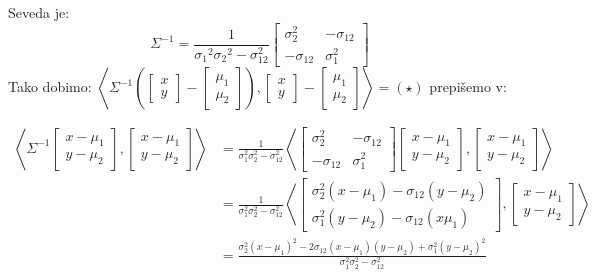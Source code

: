 \documentclass[12pt]{book}
\def\n{\noindent}
\theoremstyle{definition}
\theoremstyle{plain}
\theoremstyle{plain}
\theoremstyle{plain}
\theoremstyle{plain}
\theoremstyle{remark}
\begin{document}
\n Seveda je: 
$$
\Sigma^{-1}=\frac{1}{\sigma_1{ }^2 \sigma_2{ }^2-\sigma_{12}^2}\begin{bmatrix} \sigma_2^2 & -\sigma_{12} \\ -\sigma_{1 2} & \sigma_1^2 \end{bmatrix}
$$
Tako dobimo:  $\left\langle\Sigma^{-1}\left(\begin{bmatrix} x \\ y \end{bmatrix}-\begin{bmatrix} \mu_1 \\ \mu_2 \end{bmatrix}\right),\begin{bmatrix} x \\ y \end{bmatrix}-\begin{bmatrix} \mu_1 \\ \mu_2 \end{bmatrix}\right\rangle = (\star)$ prepišemo v: 

\begin{align*}
    \left\langle\Sigma^{-1}\begin{bmatrix} x - \mu_1 \\ y - \mu_2 \end{bmatrix},\begin{bmatrix} x - \mu_1 \\ y - \mu_2 \end{bmatrix}\right\rangle &= \frac{1}{\sigma_1^2 \sigma_2^2-\sigma_{12}^2} \left\langle \begin{bmatrix}\sigma_2^2 & -\sigma_{12} \\ -\sigma_{12} & \sigma_1^2 \end{bmatrix}\begin{bmatrix} x-\mu_1 \\ y-\mu_2 \end{bmatrix}, \begin{bmatrix} x-\mu_1 \\ y-\mu_2 \end{bmatrix}\right\rangle \\
    &= \frac{1}{\sigma_1^2 \sigma_2^2-\sigma_{12}^2} \left\langle \begin{bmatrix} \sigma_2^2\left(x-\mu_1\right)-\sigma_{12}\left(y-\mu_2\right) \\ \sigma_1^2\left(y-\mu_2\right)-\sigma_{12}\left(x \mu_1\right) \end{bmatrix}, \begin{bmatrix} x-\mu_1 \\ y-\mu_2 \end{bmatrix} \right\rangle \\
    &= \frac{\sigma_2^2\left(x-\mu_1\right)^2-2 \sigma_{12}\left(x-\mu_1\right)\left(y-\mu_2\right)+\sigma_1^2\left(y-\mu_2\right)^2}{\sigma_1^2 \sigma_2^2-\sigma_{12}^2}
\end{align*}
\end{document}
